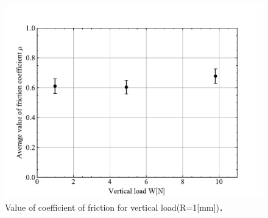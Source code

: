 \begin{table}[htbp]
    \centering
    \caption{Coefficient of friction measurement results(R=8[mm]).}
    \label{tbl:ボール半径8}
\end{table}

\begin{figure}[htbp]
    \centering %
    \includegraphics[width=100truemm,clip]{fig/fig_1mm.pdf}
    \caption{Value of coefficient of friction for vertical load(R=1[mm])．}
    \label{fig:fig_1mm}
\end{figure}


